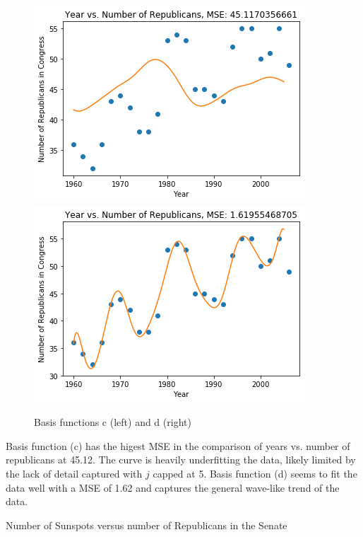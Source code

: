 \documentclass[submit]{harvardml}
\begin{document}
\begin{figure}[!htbp]
\begin{center}
    \includegraphics[scale=.55]{13.png}
    \includegraphics[scale=.55]{14.png}
    \caption{Basis functions c (left) and d (right)}
\end{center}
\end{figure}

Basis function (c) has the higest MSE in the comparison of years vs. number of republicans at 45.12. The curve is heavily underfitting the data, likely limited by the lack of detail captured with $j$ capped at 5. Basis function (d) seems to fit the data well with a MSE of 1.62 and captures the general wave-like trend of the data. 

Number of Sunspots versus number of Republicans in the Senate
\end{document}
